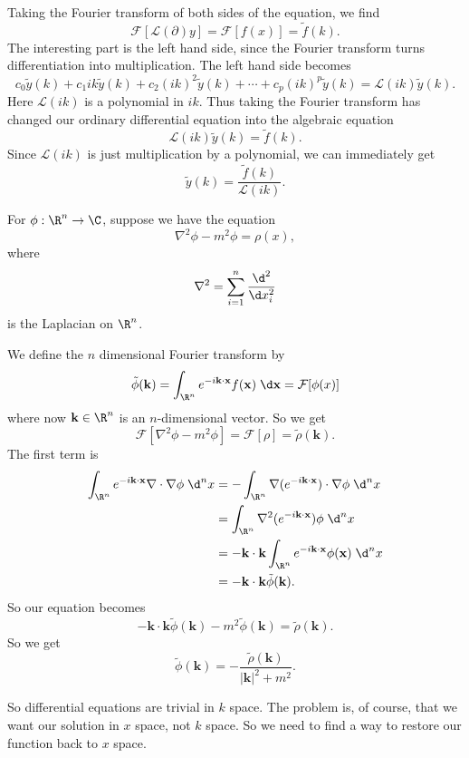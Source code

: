 \documentclass[a4paper]{article}
\begin{document}
Taking the Fourier transform of both sides of the equation, we find
\[
  \mathcal{F}[\mathcal{L}(\partial)y] = \mathcal{F}[f(x)] = \tilde{f}(k).
\]
The interesting part is the left hand side, since the Fourier transform turns differentiation into multiplication. The left hand side becomes
\[
  c_0 \tilde{y}(k) + c_1 ik\tilde{y}(k) + c_2 (ik)^2 \tilde{y}(k) + \cdots + c_p (ik)^p \tilde{y}(k) = \mathcal{L}(ik) \tilde{y}(k).
\]
Here $\mathcal{L}(ik)$ is a polynomial in $ik$. Thus taking the Fourier transform has changed our ordinary differential equation into the algebraic equation
\[
  \mathcal{L}(ik) \tilde{y}(k) = \tilde{f}(k).
\]
Since $\mathcal{L}(ik)$ is just multiplication by a polynomial, we can immediately get
\[
  \tilde{y}(k) = \frac{\tilde{f}(k)}{\mathcal{L}(ik)}.
\]
\begin{eg}
  For $\phi: \R^n \to \C$, suppose we have the equation
  \[
    \nabla^2 \phi - m^2 \phi = \rho(x),
  \]
  where
  \[
    \nabla^2 = \sum_{i = 1}^n \frac{\d^2}{\d x_i^2}
  \]
  is the Laplacian on $\R^n$.

  We define the $n$ dimensional Fourier transform by
  \[
    \tilde{\phi} (\mathbf{k}) = \int_{\R^n} e^{-i\mathbf{k}\cdot \mathbf{x}} f(\mathbf{x})\;\d \mathbf{x} = \mathcal{F}[\phi(x)]
  \]
  where now $\mathbf{k} \in \R^n$ is an $n$-dimensional vector. So we get
  \[
    \mathcal{F}[\nabla^2 \phi - m^2 \phi] = \mathcal{F}[\rho] = \tilde{\rho}(\mathbf{k}).
  \]
  The first term is
  \begin{align*}
    \int_{\R^n} e^{-i\mathbf{k}\cdot \mathbf{x}} \nabla\cdot \nabla \phi \;\d ^n x &= -\int_{\R^n} \nabla (e^{-i\mathbf{k}\cdot \mathbf{x}}) \cdot \nabla \phi \;\d^n x\\
    &= \int_{\R^n} \nabla^2 (e^{-i\mathbf{k}\cdot \mathbf{x}}) \phi \;\d^n x\\
    &= -\mathbf{k}\cdot \mathbf{k} \int_{\R^n} e^{-i\mathbf{k}\cdot \mathbf{x}} \phi(\mathbf{x})\;\d^n x\\
    &= -\mathbf{k}\cdot \mathbf{k} \tilde{\phi} (\mathbf{k}).
  \end{align*}
  So our equation becomes
  \[
    -\mathbf{k}\cdot \mathbf{k} \tilde{\phi}(\mathbf{k}) - m^2 \tilde{\phi}(\mathbf{k}) = \tilde{\rho}(\mathbf{k}).
  \]
  So we get
  \[
    \tilde{\phi}(\mathbf{k}) = -\frac{\tilde{\rho}(\mathbf{k})}{|\mathbf{k}|^2 + m^2}.
  \]
\end{eg}
So differential equations are trivial in $k$ space. The problem is, of course, that we want our solution in $x$ space, not $k$ space. So we need to find a way to restore our function back to $x$ space.
\end{document}

